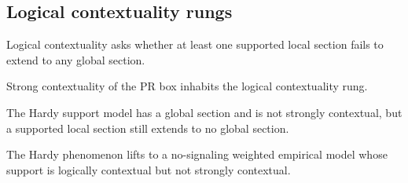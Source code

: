 \subsection{Logical contextuality rungs}

\begin{proposition}\label{thm:logical-contextuality}\leanok{}
Logical contextuality asks whether at least one supported local section fails
to extend to any global section.
\end{proposition}

\begin{theorem}\label{thm:pr-logical-contextuality}\leanok{}
Strong contextuality of the PR box inhabits the logical contextuality rung.
\end{theorem}

\begin{theorem}\label{thm:hardy-logical-not-strong}\leanok{}
The Hardy support model has a global section and is not strongly contextual,
but a supported local section still extends to no global section.
\end{theorem}

\begin{theorem}\label{thm:hardy-probabilistic-logical-not-strong}\leanok{}
The Hardy phenomenon lifts to a no-signaling weighted empirical model whose
support is logically contextual but not strongly contextual.
\end{theorem}
